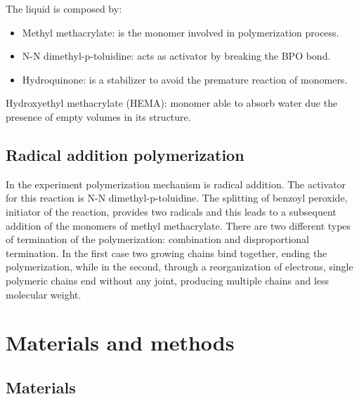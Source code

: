 \documentclass[a4paper, 11pt]{article}
\begin{document}
The liquid is composed by:
\begin{itemize}
\item Methyl methacrylate: is the monomer involved in polymerization process.
\begin{figure}[h!]
\centering
{} 
\end{figure}
\item N-N dimethyl-p-toluidine: acts as activator by breaking the BPO bond.
\item Hydroquinone: is a stabilizer to avoid the premature reaction of monomers.
\end{itemize}
Hydroxyethyl methacrylate (HEMA): monomer able to absorb water due the presence of empty volumes in its structure. 
\begin{figure}[h]
\centering
{} 
\end{figure}

\subsection{Radical addition polymerization}

In the experiment polymerization mechanism is radical addition. The activator for this reaction is N-N dimethyl-p-toluidine. The splitting of benzoyl peroxide, initiator of the reaction, provides two radicals and this leads to a subsequent addition of the monomers of methyl methacrylate. There are two different types of termination of the polymerization: combination and disproportional termination. In the first case two growing chains bind together, ending the polymerization, while in the second, through a reorganization of electrons, single polymeric chains end without any joint, producing multiple chains and less molecular weight.

\section{Materials and methods}

\subsection{Materials}
\end{document}
